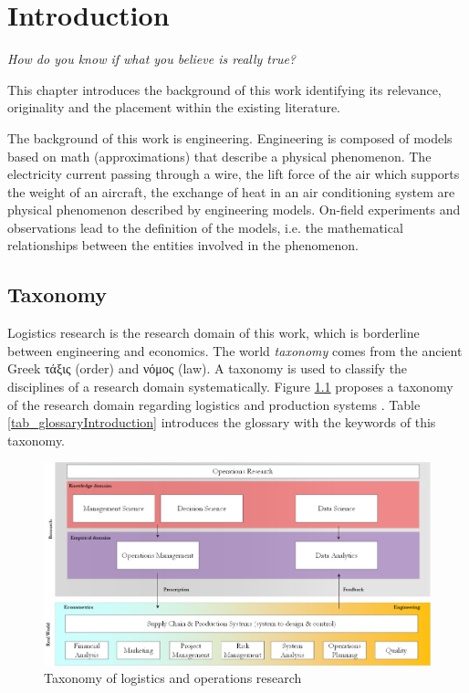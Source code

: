 \chapter{Introduction}

\epigraph{\textit{How do you know if what you believe is really true?}}{}


This chapter introduces the background of this work identifying its relevance, originality and the placement within the existing literature.\par

The background of this work is engineering. Engineering is composed of models based on math (approximations) that describe a physical phenomenon. The electricity current passing through a wire, the lift force of the air which supports the weight of an aircraft, the exchange of heat in an air conditioning system are physical phenomenon described by engineering models. On-field experiments and observations lead to the definition of the models, i.e. the mathematical relationships between the entities involved in the phenomenon.

\section{Taxonomy} \label{secSupplyChainTaxonomy}

Logistics research is the research domain of this work, which is borderline between engineering and economics. The world \textit{taxonomy} comes from the ancient Greek \textgreek{τάξις} (order) and \textgreek{νόμος} (law). A taxonomy is used to classify the disciplines of a research domain systematically. Figure \ref{fig_operationsResearch} proposes a taxonomy of the research domain regarding logistics and production systems
. Table \ref{tab_glossaryIntroduction} introduces the glossary with the keywords of this taxonomy.

\begin{figure}[hbt!]
\centering
\includegraphics[width=1\textwidth]{SectionIntroduction/introduction_figures/fig_operationsResearch.png}
\captionsetup{type=figure}
\caption{Taxonomy of logistics and operations research}
\label{fig_operationsResearch}
\end{figure}


